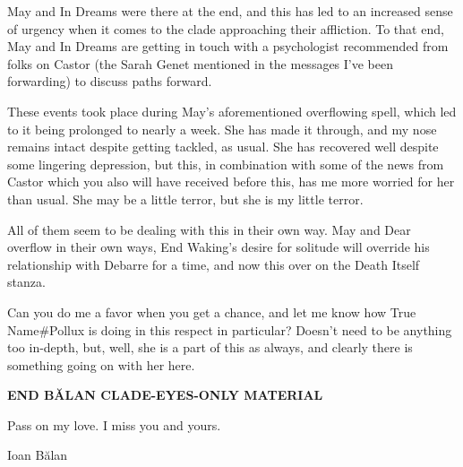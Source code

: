 May and In Dreams were there at the end, and this has led to an increased sense of urgency when it comes to the clade approaching their affliction. To that end, May and In Dreams are getting in touch with a psychologist recommended from folks on Castor (the Sarah Genet mentioned in the messages I've been forwarding) to discuss paths forward.

These events took place during May's aforementioned overflowing spell, which led to it being prolonged to nearly a week. She has made it through, and my nose remains intact despite getting tackled, as usual. She has recovered well despite some lingering depression, but this, in combination with some of the news from Castor which you also will have received before this, has me more worried for her than usual. She may be a little terror, but she is my little terror.

All of them seem to be dealing with this in their own way. May and Dear overflow in their own ways, End Waking's desire for solitude will override his relationship with Debarre for a time, and now this over on the Death Itself stanza.

Can you do me a favor when you get a chance, and let me know how True Name\#Pollux is doing in this respect in particular? Doesn't need to be anything too in-depth, but, well, she is a part of this as always, and clearly there is something going on with her here.

\begin{center}
\textbf{END BĂLAN CLADE-EYES-ONLY MATERIAL}
\end{center}

Pass on my love. I miss you and yours.

Ioan Bălan
